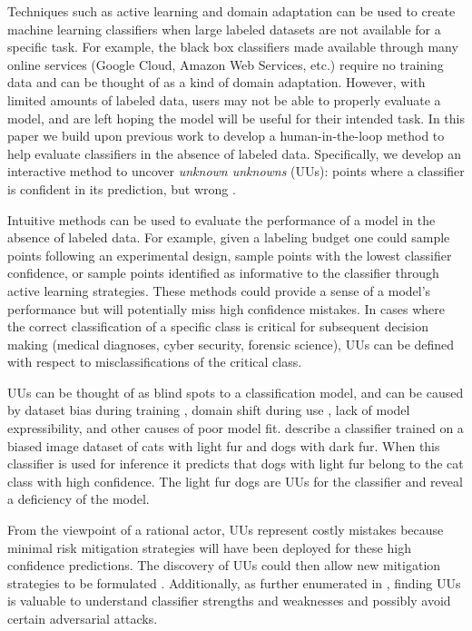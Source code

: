 \documentclass[letterpaper]{article} %
\newcommand{\km}[1]{{\color{red} #1}} %
\begin{document}
Techniques such as active learning \citep{Settles2010} and domain adaptation \citep{Patel2014} can be used to create machine learning classifiers when large labeled datasets are not available for a specific task.  For example, the black box classifiers made available through many online services (Google Cloud, Amazon Web Services, etc.) require no training data and can be thought of as a kind of domain adaptation.  However, with limited amounts of labeled data, users may not be able to properly evaluate a model, and are left hoping the model will be useful for their intended task.  In this paper we build upon previous work to develop a human-in-the-loop method to help evaluate classifiers in the absence of labeled data.  Specifically, we develop an interactive method to uncover \textit{unknown unknowns} (UUs): points where a classifier is confident in its prediction, but wrong \citep{Attenberg2015}.  

Intuitive methods can be used to evaluate the performance of a model in the absence of labeled data.  For example, given a labeling budget one could sample points following an experimental design, sample points with the lowest classifier confidence, or sample points identified as informative to the classifier through active learning strategies.  These methods could provide a sense of a model's performance but will potentially miss high confidence mistakes. In cases where the correct classification of a specific class is critical for subsequent decision making (medical diagnoses, cyber security, forensic science), UUs can be defined with respect to misclassifications of the critical class.

UUs can be thought of as blind spots to a classification model, and can be caused by dataset bias during training \citep{stock2017convnets}, domain shift during use \citep{sugiyama2017dataset}, lack of model expressibility, and other causes of poor model fit. \citet{Lakkaraju2016} describe a classifier trained on a biased image dataset of cats with light fur and dogs with dark fur. When this classifier is used for inference it predicts that dogs with light fur belong to the cat class with high confidence.  The light fur dogs are UUs for the classifier and reveal a deficiency of the model.  

From the viewpoint of a rational actor, UUs represent costly mistakes because minimal risk mitigation strategies will have been deployed for these high confidence predictions.  The discovery of UUs could then allow new mitigation strategies to be formulated \citep{Nushi2016a}. Additionally, as further enumerated in \citet{Bansal2018}, finding UUs is valuable to understand classifier strengths and weaknesses and possibly avoid certain adversarial attacks.
\end{document}
